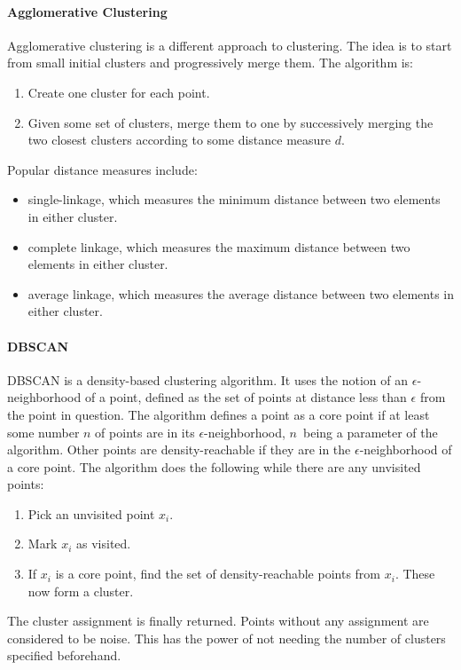 \paragraph{Agglomerative Clustering}
Agglomerative clustering is a different approach to clustering. The idea is to start from small initial clusters and progressively merge them. The algorithm is:
\begin{enumerate}
	\item Create one cluster for each point.
	\item Given some set of clusters, merge them to one by successively merging the two closest clusters according to some distance measure $d$.
\end{enumerate}
Popular distance measures include:
\begin{itemize}
	\item single-linkage, which measures the minimum distance between two elements in either cluster.
	\item complete linkage, which measures the maximum distance between two elements in either cluster.
	\item average linkage, which measures the average distance between two elements in either cluster.
\end{itemize}

\paragraph{DBSCAN}
DBSCAN is a density-based clustering algorithm. It uses the notion of an $\epsilon$-neighborhood of a point, defined as the set of points at distance less than $\epsilon$ from the point in question. The algorithm defines a point as a core point if at least some number $n$ of points are in its $\epsilon$-neighborhood, $n$ being a parameter of the algorithm. Other points are density-reachable if they are in the $\epsilon$-neighborhood of a core point. The algorithm does the following while there are any unvisited points:
\begin{enumerate}
	\item Pick an unvisited point $x_{i}$.
	\item Mark $x_{i}$ as visited.
	\item If $x_{i}$ is a core point, find the set of density-reachable points from $x_{i}$. These now form a cluster.
\end{enumerate}
The cluster assignment is finally returned. Points without any assignment are considered to be noise. This has the power of not needing the number of clusters specified beforehand.

